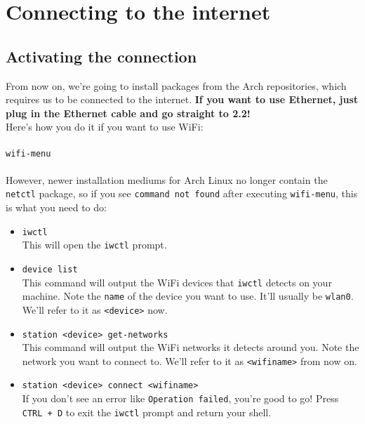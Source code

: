 \documentclass{article}
\begin{document}
\section{Connecting to the internet}
\subsection{Activating the connection}
From now on, we're going to install packages from the Arch repositories, which requires us to be connected to the internet. \textbf{If you want to use Ethernet, just plug in the Ethernet cable and go straight to 2.2!}\\Here's how you do it if you want to use WiFi:
\\\\
\texttt{wifi-menu}
\\\\
However, newer installation mediums for Arch Linux no longer contain the \texttt{netctl} package, so if you see \texttt{command not found} after executing \texttt{wifi-menu}, this is what you need to do:
\begin{itemize}
  \item{\texttt{iwctl}}
    \\This will open the \texttt{iwctl} prompt.
  \item{\texttt{device list}}
    \\This command will output the WiFi devices that \texttt{iwctl} detects on your machine. Note the \texttt{name} of the device you want to use. It'll usually be \texttt{wlan0}. We'll refer to it as \texttt{<device>} now.
  \item{\texttt{station <device> get-networks}}
    \\This command will output the WiFi networks it detects around you. Note the network you want to connect to. We'll refer to it as \texttt{<wifiname>} from now on.
  \item{\texttt{station <device> connect <wifiname>}}
    \\If you don't see an error like \texttt{Operation failed}, you're good to go! Press \texttt{CTRL + D} to exit the \texttt{iwctl} prompt and return your shell.
\end{itemize}
\end{document}
